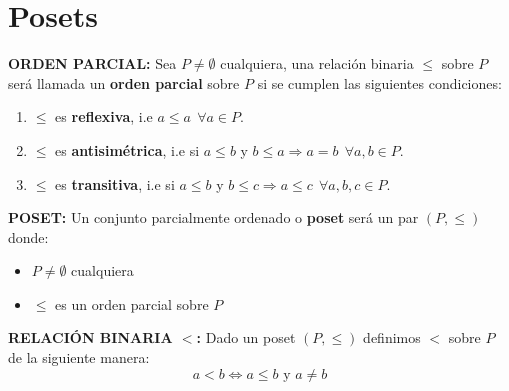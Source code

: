 \section{Posets}
  \PN \textbf{ORDEN PARCIAL:} Sea $P \neq \emptyset$ cualquiera, una relación binaria $\leq$ sobre $ P$ será llamada un
  \textbf{orden parcial} sobre $P$ si se cumplen las siguientes condiciones:
  \begin{enumerate}
    \item $\leq$ es \textbf{reflexiva}, i.e $a \leq a \ \ \forall a \in P$.
    \item $\leq$ es \textbf{antisimétrica}, i.e si $a \leq b$ y $b \leq a \Rightarrow a=b \ \ \forall a, b \in P$.
    \item $\leq$ es \textbf{transitiva}, i.e si $a \leq b$ y $b \leq c \Rightarrow a \leq c \ \ \forall a, b, c \in P$.
  \end{enumerate}

  \PN \textbf{POSET:} Un conjunto parcialmente ordenado o \textbf{poset} será un par $(P,\leq)$ donde:
  \begin{itemize}
    \item $P \neq \emptyset$ cualquiera
    \item $\leq$ es un orden parcial sobre $P$
  \end{itemize}

  \PN \textbf{RELACIÓN BINARIA $<$:} Dado un poset $(P,\leq)$ definimos $<$ sobre $P$ de la siguiente manera:
  \[
    a < b \Leftrightarrow a \leq b \text{ y } a \neq b
  \]

